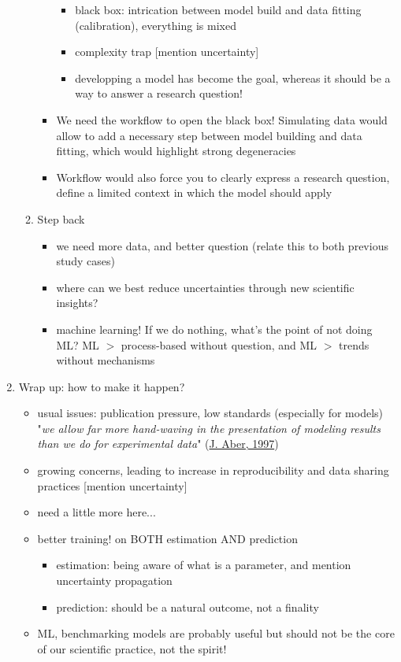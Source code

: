 \documentclass[11pt]{article}
\begin{document}
\begin{enumerate}
\begin{enumerate}
\begin{itemize}
\begin{itemize}
\item black box: intrication between model build and data fitting (calibration), everything is mixed 
\item complexity trap [mention uncertainty]
\item developping a model has become the goal, whereas it should be a way to answer a research question!
\end{itemize}
\item We need the workflow to open the black box! Simulating data would allow to add a necessary step between model building and data fitting, which would highlight strong degeneracies
\item Workflow would also force you to clearly express a research question, define a limited context in which the model should apply
\end{itemize}
\item Step back
\begin{itemize}
\item we need more data, and better question (relate this to both previous study cases)
\item where can we best reduce uncertainties through new scientific insights?
\item machine learning! If we do nothing, what's the point of not doing ML? ML $>$ process-based without question, and ML $>$ trends without mechanisms
\end{itemize}
\end{enumerate}
\item Wrap up: how to make it happen?
\begin{itemize}
\item usual issues: publication pressure, low standards (especially for models)\\
"\emph{we allow far more hand-waving in the presentation of modeling results than we do for experimental data}" (\href{https://harvardforest1.fas.harvard.edu/publications/pdfs/Aber_BulletinEcoSocAmerica_1997.pdf}{J. Aber, 1997})
\item growing concerns, leading to increase in reproducibility and data sharing practices [mention uncertainty]
\item need a little more here...
\item better training! on BOTH estimation AND prediction
\begin{itemize}
\item estimation: being aware of what is a parameter, and mention uncertainty propagation
\item prediction: should be a natural outcome, not a finality
\end{itemize}
\item ML, benchmarking models are probably useful but should not be the core of our scientific practice, not the spirit!
\end{itemize}
\end{enumerate}
\end{document}
